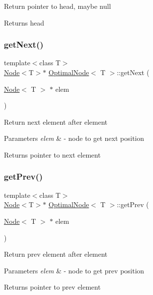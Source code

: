 Return pointer to head, maybe null \begin{DoxyReturn}{Returns}
head 
\end{DoxyReturn}
\mbox{\label{classOptimalList_aef25e96f7d379cd8c383e58e2179ddee}} 
\subsubsection{\texorpdfstring{get\+Next()}{getNext()}}
{\footnotesize\ttfamily template$<$class T$>$ \\
\hyperlink{classList}{Node}$<$T$>$$\ast$ \hyperlink{classOptimalList}{Optimal\+Node}$<$ T $>$\+::get\+Next (\begin{DoxyParamCaption}\item[{\hyperlink{classList}{Node}$<$ T $>$ $\ast$}]{elem }\end{DoxyParamCaption})\hspace{0.3cm}{\ttfamily [inline]}}

Return next element after element 
\begin{DoxyParams}{Parameters}
{\em elem} & -\/ node to get next position \\
\hline
\end{DoxyParams}
\begin{DoxyReturn}{Returns}
pointer to next element 
\end{DoxyReturn}
\mbox{\label{classOptimalList_a20ba639c8823ac7fbc486fbcfeb23514}} 
\subsubsection{\texorpdfstring{get\+Prev()}{getPrev()}}
{\footnotesize\ttfamily template$<$class T$>$ \\
\hyperlink{classList}{Node}$<$T$>$$\ast$ \hyperlink{classOptimalList}{Optimal\+Node}$<$ T $>$\+::get\+Prev (\begin{DoxyParamCaption}\item[{\hyperlink{classList}{Node}$<$ T $>$ $\ast$}]{elem }\end{DoxyParamCaption})\hspace{0.3cm}{\ttfamily [inline]}}

Return prev element after element 
\begin{DoxyParams}{Parameters}
{\em elem} & -\/ node to get prev position \\
\hline
\end{DoxyParams}
\begin{DoxyReturn}{Returns}
pointer to prev element 
\end{DoxyReturn}
\mbox{\label{classOptimalList_a712d1c3f81c91ce3f55dda49e3f26229}} 
